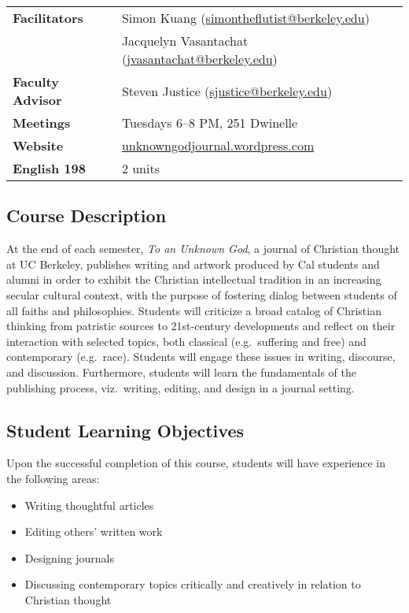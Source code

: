 \begin{tabular}{>{\bfseries}ll}
	 Facilitators & Simon Kuang (\url{simontheflutist@berkeley.edu}) \\
		& Jacquelyn Vasantachat (\url{jvasantachat@berkeley.edu}) \\
	Faculty Advisor & Steven Justice (\url{sjustice@berkeley.edu}) \\
	Meetings & Tuesdays 6--8 PM, 251 Dwinelle  \\
	Website & \url{unknowngodjournal.wordpress.com}  \\
	English 198 & 2 units 
\end{tabular}

\subsection{Course Description}
At the end of each semester, \emph{To an Unknown God}, a journal of Christian thought at UC Berkeley, publishes writing and artwork produced
by Cal students and alumni in order to exhibit the Christian intellectual tradition in an increasing secular cultural context, with the purpose of fostering dialog between students of all faiths and philosophies.
Students will criticize a broad catalog of Christian thinking from patristic sources to 21st-century developments and reflect on their interaction with selected topics, both classical (e.g.\ suffering and free) and contemporary (e.g.\ race). Students will engage these issues in writing, discourse, and discussion.
Furthermore, students will learn the fundamentals of the publishing process, viz.\ writing, editing, and design in a journal setting.

\subsection{Student Learning Objectives}
Upon the successful completion of this course, students will have experience in the following areas:
\begin{itemize}
	\item Writing thoughtful articles
	\item Editing others’ written work
	\item Designing journals
	\item Discussing contemporary topics critically and creatively in relation to Christian thought
\end{itemize}

